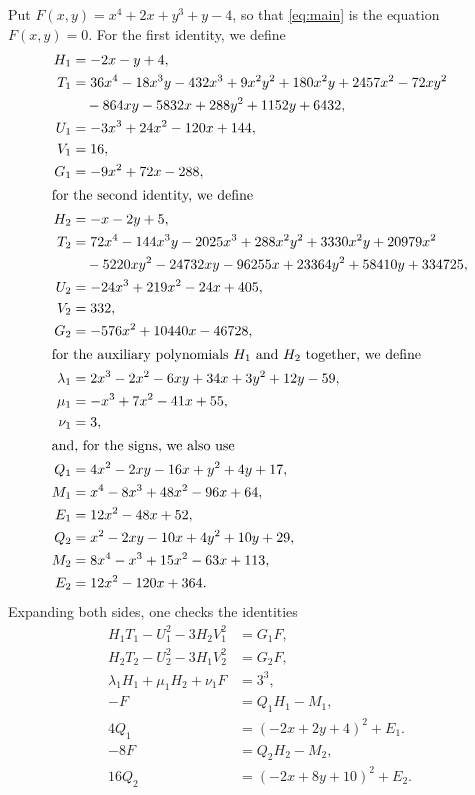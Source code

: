 \documentclass[11pt]{article}
\begin{document}
Put $F(x,y)=x^{4}+2x+y^{3}+y-4$, so that \eqref{eq:main} is the equation $F(x,y)=0$. For the first identity, we define
\begin{align*}
H_{1}&=-2x-y+4,\\
T_{1}&=36x^{4}-18x^{3}y-432x^{3}+9x^{2}y^{2}+180x^{2}y+2457x^{2}-72xy^{2}\\
&\quad-864xy-5832x+288y^{2}+1152y+6432,\\
U_{1}&=-3x^{3}+24x^{2}-120x+144,\\
V_{1}&=16,\\
G_{1}&=-9x^{2}+72x-288,\\
\intertext{for the second identity, we define}
H_{2}&=-x-2y+5,\\
T_{2}&=72x^{4}-144x^{3}y-2025x^{3}+288x^{2}y^{2}+3330x^{2}y+20979x^{2}\\
&\quad-5220xy^{2}-24732xy-96255x+23364y^{2}+58410y+334725,\\
U_{2}&=-24x^{3}+219x^{2}-24x+405,\\
V_{2}&=332,\\
G_{2}&=-576x^{2}+10440x-46728,\\
\intertext{for the auxiliary polynomials $H_{1}$ and $H_{2}$ together, we define}
\lambda_{1}&=2x^{3}-2x^{2}-6xy+34x+3y^{2}+12y-59,\\
\mu_{1}&=-x^{3}+7x^{2}-41x+55,\\
\nu_{1}&=3,\\
\intertext{and, for the signs, we also use}
Q_{1}&=4x^{2}-2xy-16x+y^{2}+4y+17,\\
M_{1}&=x^{4}-8x^{3}+48x^{2}-96x+64,\\
E_{1}&=12x^{2}-48x+52,\\
Q_{2}&=x^{2}-2xy-10x+4y^{2}+10y+29,\\
M_{2}&=8x^{4}-x^{3}+15x^{2}-63x+113,\\
E_{2}&=12x^{2}-120x+364.
\end{align*}
Expanding both sides, one checks the identities
\begin{align}
H_{1}T_{1}-U_{1}^2-3H_{2}V_{1}^2&=G_{1}F,\label{eq:norm1}\\
H_{2}T_{2}-U_{2}^2-3H_{1}V_{2}^2&=G_{2}F,\label{eq:norm2}\\
\lambda_{1}H_{1}+\mu_{1}H_{2}+\nu_{1}F&=3^{3},\label{eq:cross1}\\
-F&=Q_{1}H_{1}-M_{1},\label{eq:sign1}\\
4Q_{1}&=(-2x+2y+4)^2+E_{1}.\label{eq:sign1b}\\
-8F&=Q_{2}H_{2}-M_{2},\label{eq:sign2}\\
16Q_{2}&=(-2x+8y+10)^2+E_{2}.\label{eq:sign2b}
\end{align}
\end{document}
